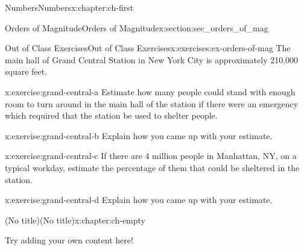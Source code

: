 \documentclass[twoside,10pt,]{book}
\numberwithin{equation}{chapter}
\begin{document}
\begin{chapterptx}{Numbers}{}{Numbers}{}{}{x:chapter:ch-first}
\begin{sectionptx}{Orders of Magnitude}{}{Orders of Magnitude}{}{}{x:section:sec_orders_of_mag}
\begin{exercises-subsection-numberless}{Out of Class Exercises}{}{Out of Class Exercises}{}{}{x:exercises:ex-orders-of-mag}
The main hall of Grand Central Station in New York City is approximately \textdollar{}210,000\textdollar{} square feet.%
\begin{divisionexercise}{11}{}{}{x:exercise:grand-central-a}%
Estimate how many people could stand with enough room to turn around in the main hall of the station if there were an emergency which required that the station be used to shelter people.\end{divisionexercise}%
\begin{divisionexercise}{12}{}{}{x:exercise:grand-central-b}%
Explain how you came up with your estimate.\end{divisionexercise}%
\begin{divisionexercise}{13}{}{}{x:exercise:grand-central-c}%
If there are 4 million people in Manhattan, NY, on a typical workday, estimate the percentage of them that could be sheltered in the station.\end{divisionexercise}%
\begin{divisionexercise}{14}{}{}{x:exercise:grand-central-d}%
Explain how you came up with your estimate.\end{divisionexercise}%
\end{exercises-subsection-numberless}
\end{sectionptx}
\end{chapterptx}
%
%
\typeout{************************************************}
\typeout{************************************************}
%
\begin{chapterptx}{(No title)}{}{(No title)}{}{}{x:chapter:ch-empty}
\begin{introduction}{}%
Try adding your own content here!%
\end{introduction}%
\end{chapterptx}
%
%
\typeout{************************************************}
\typeout{************************************************}
%
\end{document}
